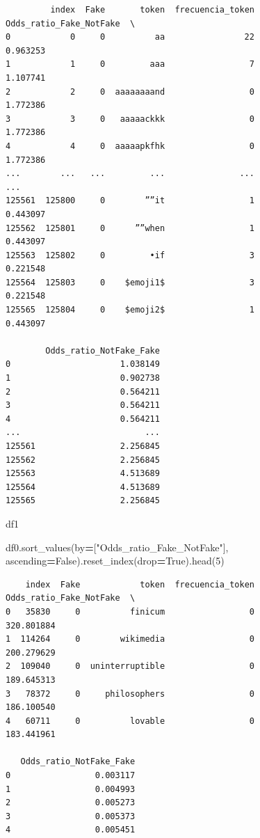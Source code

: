 \documentclass[
  11pt,
  a4paper,
]{article}
\newenvironment{Shaded}{\begin{snugshade}}{\end{snugshade}}
\newcommand{\DecValTok}[1]{\textcolor[rgb]{0.00,0.00,0.81}{#1}}
\newcommand{\NormalTok}[1]{#1}
\newcommand{\OperatorTok}[1]{\textcolor[rgb]{0.81,0.36,0.00}{\textbf{#1}}}
\newcommand{\StringTok}[1]{\textcolor[rgb]{0.31,0.60,0.02}{#1}}
\newcommand{\VariableTok}[1]{\textcolor[rgb]{0.00,0.00,0.00}{#1}}
\begin{document}
\begin{verbatim}
         index  Fake       token  frecuencia_token  Odds_ratio_Fake_NotFake  \
0            0     0          aa                22                 0.963253   
1            1     0         aaa                 7                 1.107741   
2            2     0  aaaaaaaand                 0                 1.772386   
3            3     0   aaaaackkk                 0                 1.772386   
4            4     0  aaaaapkfhk                 0                 1.772386   
...        ...   ...         ...               ...                      ...   
125561  125800     0        ””it                 1                 0.443097   
125562  125801     0      ””when                 1                 0.443097   
125563  125802     0         •if                 3                 0.221548   
125564  125803     0    ️$emoji1$                 3                 0.221548   
125565  125804     0    $emoji2$                 1                 0.443097   

        Odds_ratio_NotFake_Fake  
0                      1.038149  
1                      0.902738  
2                      0.564211  
3                      0.564211  
4                      0.564211  
...                         ...  
125561                 2.256845  
125562                 2.256845  
125563                 4.513689  
125564                 4.513689  
125565                 2.256845  
\end{verbatim}

\begin{Shaded}
\begin{Highlighting}[]
\NormalTok{df1}
\end{Highlighting}
\end{Shaded}

\begin{Shaded}
\begin{Highlighting}[]
\NormalTok{df0.sort\_values(by}\OperatorTok{=}\NormalTok{[}\StringTok{"Odds\_ratio\_Fake\_NotFake"}\NormalTok{], ascending}\OperatorTok{=}\VariableTok{False}\NormalTok{).reset\_index(drop}\OperatorTok{=}\VariableTok{True}\NormalTok{).head(}\DecValTok{5}\NormalTok{)}
\end{Highlighting}
\end{Shaded}

\begin{verbatim}
    index  Fake            token  frecuencia_token  Odds_ratio_Fake_NotFake  \
0   35830     0          finicum                 0               320.801884   
1  114264     0        wikimedia                 0               200.279629   
2  109040     0  uninterruptible                 0               189.645313   
3   78372     0     philosophers                 0               186.100540   
4   60711     0          lovable                 0               183.441961   

   Odds_ratio_NotFake_Fake  
0                 0.003117  
1                 0.004993  
2                 0.005273  
3                 0.005373  
4                 0.005451
\end{verbatim}
\end{document}
